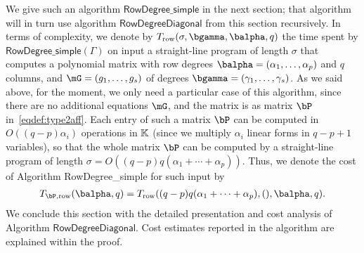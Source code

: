 \documentclass[12pt]{article}
\begin{document}
We give such an algorithm $\mathsf{RowDegree\_simple}$ in the next section;
that algorithm will in turn use algorithm $\mathsf{RowDegreeDiagonal}$
from this section recursively. In terms of complexity, we denote by
$T_{\rm row}(\sigma,\bgamma,\balpha,q)$ the time spent by
$\mathsf{RowDegree\_simple}(\Gamma)$ on input a straight-line program
of length $\sigma$ that computes a polynomial matrix with row degrees
$\balpha=(\alpha_1,\dots,\alpha_p)$ and $q$ columns, and
$\mG=(g_1,\dots,g_s)$ of degrees $\bgamma=(\gamma_1,\dots,\gamma_s)$.
As we said above, for the moment, we only need a particular case of
this algorithm, since there are no additional equations $\mG$, and the
matrix is as matrix $\bP$ in~\eqref{eqdef:type2aff}. Each entry of
such a matrix $\bP$ can be computed in $O((q-p) \alpha_i)$ operations
in $\mathbb{K}$ (since we multiply $\alpha_i$ linear forms in $q-p+1$
variables), so that the whole matrix $\bP$ can be computed by a
straight-line program of length
$\sigma=O((q-p)q(\alpha_1+\cdots+\alpha_p))$. Thus, we denote the cost
of Algorithm {\sf RowDegree\_simple} for such input by
\begin{align}
T_{\bP,{\rm row}}(\balpha,q)=T_{\rm row}((q-p)q(\alpha_1+\cdots+\alpha_p),(),\balpha,q).
\end{align}
We conclude this section with the detailed presentation and cost 
analysis of Algorithm $\mathsf{RowDegreeDiagonal}$. Cost estimates reported in the 
algorithm are explained within the proof. 
\end{document}
